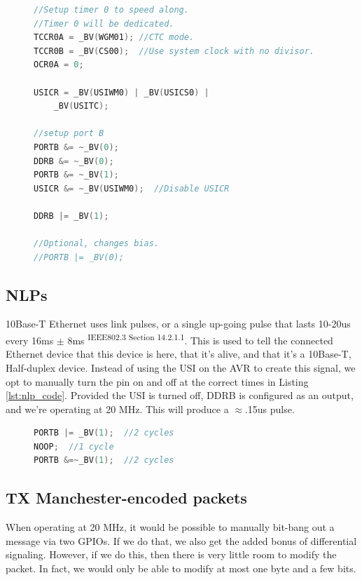 \documentclass[13pt]{ltxdoc}
\begin{document}
\begin{figure}
\begin{lstlisting}[caption=USI Setup\label{lst:usisetup},language=C, frame=single]
//Setup timer 0 to speed along.
//Timer 0 will be dedicated.
TCCR0A = _BV(WGM01); //CTC mode.
TCCR0B = _BV(CS00);  //Use system clock with no divisor.
OCR0A = 0;

USICR = _BV(USIWM0) | _BV(USICS0) |
	_BV(USITC);

//setup port B
PORTB &= ~_BV(0); 
DDRB &= ~_BV(0);
PORTB &= ~_BV(1);
USICR &= ~_BV(USIWM0);  //Disable USICR

DDRB |= _BV(1);

//Optional, changes bias.
//PORTB |= _BV(0);
\end{lstlisting}
\end{figure}


\subsection{NLPs}
10Base-T Ethernet uses link pulses, or a single up-going pulse that lasts 10-20us
every 16ms $\pm$ 8ms \textsuperscript{IEEE802.3 Section 14.2.1.1}.  This is used to tell
the connected Ethernet device that this device is here, that it's alive, and that it's a
10Base-T, Half-duplex device.  Instead of using the USI on the AVR to create this
signal, we opt to manually turn the pin on and off at the correct times in
Listing \ref{lst:nlp_code}.  Provided the USI is turned off, DDRB is configured as
an output, and we're operating at 20 MHz.  This will produce a $\approx$.15us pulse.

\begin{figure}
\begin{lstlisting}[caption=NLP Code\label{lst:nlp_code},language=C, frame=single]
PORTB |= _BV(1);  //2 cycles
NOOP;  //1 cycle
PORTB &=~_BV(1);  //2 cycles
\end{lstlisting}
\end{figure}

\subsection{TX Manchester-encoded packets}
When operating at 20 MHz, it would be possible to manually bit-bang out a message
via two GPIOs.  If we do that, we also get the added bonus of differential
signaling.  However, if we do this, then there is very little room to modify
the packet.  In fact, we would only be able to modify at most one byte and a
few bits.
\end{document}
